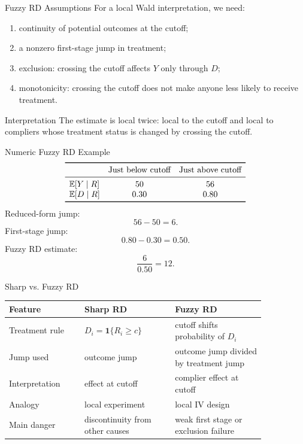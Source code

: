 \documentclass[11pt,aspectratio=169]{beamer}
\newcommand{\E}{\mathbb{E}}
\begin{document}
\begin{frame}{Fuzzy RD Assumptions}
  For a local Wald interpretation, we need:
  \begin{enumerate}
    \item continuity of potential outcomes at the cutoff;
    \item a nonzero first-stage jump in treatment;
    \item exclusion: crossing the cutoff affects \(Y\) only through \(D\);
    \item monotonicity: crossing the cutoff does not make anyone less likely to receive treatment.
  \end{enumerate}
  \begin{block}{Interpretation}
    The estimate is local twice: local to the cutoff and local to compliers whose treatment status is changed by crossing the cutoff.
  \end{block}
\end{frame}

\begin{frame}{Numeric Fuzzy RD Example}
  \[
  \begin{array}{lcc}
  \toprule
  & \text{Just below cutoff} & \text{Just above cutoff} \\
  \midrule
  \E[Y\mid R] & 50 & 56 \\
  \E[D\mid R] & 0.30 & 0.80 \\
  \bottomrule
  \end{array}
  \]
  Reduced-form jump:
  \[
    56-50=6.
  \]
  First-stage jump:
  \[
    0.80-0.30=0.50.
  \]
  Fuzzy RD estimate:
  \[
    \frac{6}{0.50}=12.
  \]
\end{frame}

\begin{frame}{Sharp vs. Fuzzy RD}
  \small
  \begin{tabular}{>{\raggedright\arraybackslash}p{0.25\linewidth}>{\raggedright\arraybackslash}p{0.30\linewidth}>{\raggedright\arraybackslash}p{0.30\linewidth}}
    \toprule
    Feature & Sharp RD & Fuzzy RD \\
    \midrule
    Treatment rule & \(D_i=\mathbf{1}\{R_i\geq c\}\) & cutoff shifts probability of \(D_i\) \\
    Jump used & outcome jump & outcome jump divided by treatment jump \\
    Interpretation & effect at cutoff & complier effect at cutoff \\
    Analogy & local experiment & local IV design \\
    Main danger & discontinuity from other causes & weak first stage or exclusion failure \\
    \bottomrule
  \end{tabular}
\end{frame}
\end{document}
